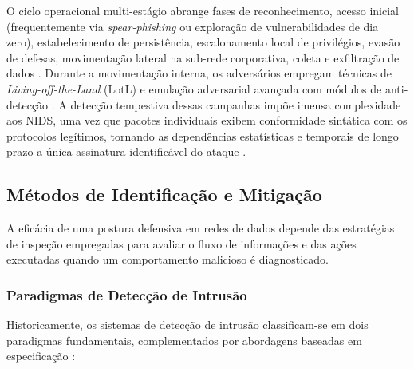 \begin{enumerate}
    O ciclo operacional multi-estágio abrange fases de reconhecimento, acesso inicial (frequentemente via \emph{spear-phishing} ou exploração de vulnerabilidades de dia zero), estabelecimento de persistência, escalonamento local de privilégios, evasão de defesas, movimentação lateral na sub-rede corporativa, coleta e exfiltração de dados \cite{deepstage2026, laccolith2024}. Durante a movimentação interna, os adversários empregam técnicas de \emph{Living-off-the-Land} (LotL) e emulação adversarial avançada com módulos de anti-detecção \cite{laccolith2024}. A detecção tempestiva dessas campanhas impõe imensa complexidade aos NIDS, uma vez que pacotes individuais exibem conformidade sintática com os protocolos legítimos, tornando as dependências estatísticas e temporais de longo prazo a única assinatura identificável do ataque \cite{stix2026}.
\end{enumerate}

\subsection{Métodos de Identificação e Mitigação}
\label{subsec:metodos_identificacao_mitigacao}

A eficácia de uma postura defensiva em redes de dados depende das estratégias de inspeção empregadas para avaliar o fluxo de informações e das ações executadas quando um comportamento malicioso é diagnosticado.

\subsubsection{Paradigmas de Detecção de Intrusão}

Historicamente, os sistemas de detecção de intrusão classificam-se em dois paradigmas fundamentais, complementados por abordagens baseadas em especificação \cite{advancedids2024}:

